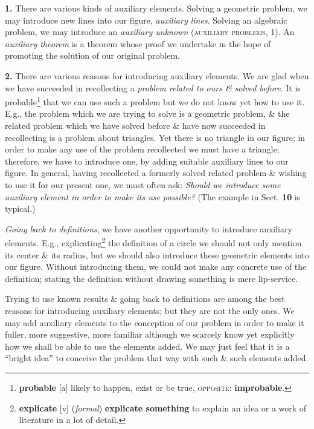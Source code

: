 \documentclass[oneside]{book}
\numberwithin{equation}{section}
\begin{document}
\textbf{1.} There are various kinds of auxiliary elements. Solving a geometric problem, we may introduce new lines into our figure, \textit{auxiliary lines}. Solving an algebraic problem, we may introduce an \textit{auxiliary unknown} (\textsc{auxiliary problems, 1}). An \textit{auxiliary theorem} is a theorem whose proof we undertake in the hope of promoting the solution of our original problem.

\textbf{2.} There are various reasons for introducing auxiliary elements. We are glad when we have succeeded in recollecting a \textit{problem related to ours \& solved before}. It is probable\footnote{\textbf{probable} [a] likely to happen, exist or be true, \textsc{opposite}: \textbf{improbable}.} that we can use such a problem but we do not know yet how to use it. E.g., the problem which we are trying to solve is a geometric problem, \& the related problem which we have solved before \& have now succeeded in recollecting is a problem about triangles. Yet there is no triangle in our figure; in order to make any use of the problem recollected we must have a triangle; therefore, we have to introduce one, by adding suitable auxiliary lines to our figure. In general, having recollected a formerly solved related problem \& wishing to use it for our present one, we must often ask: \textit{Should we introduce some auxiliary element in order to make its use possible?} (The example in Sect. \textbf{10} is typical.)

\textit{Going back to definitions}, we have another opportunity to introduce auxiliary elements. E.g., explicating\footnote{\textbf{explicate} [v] (\textit{formal}) \textbf{explicate something} to explain an idea or a work of literature in a lot of detail.} the definition of a circle we should not only mention its center \& its radius, but we should also introduce these geometric elements into our figure. Without introducing them, we could not make any concrete use of the definition; stating the definition without drawing something is mere lip-service.

Trying to use known results \& going back to definitions are among the best reasons for introducing auxiliary elements; but they are not the only ones. We may add auxiliary elements to the conception of our problem in order to make it fuller, more suggestive, more familiar although we scarcely know yet explicitly how we shall be able to use the elements added. We may just feel that it is a ``bright idea'' to conceive the problem that way with such \& such elements added.
\end{document}
